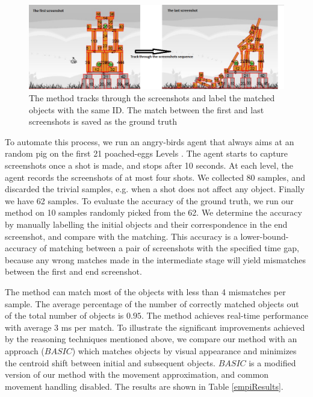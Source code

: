 \documentclass[letterpaper]{article}
\begin{document}
\begin{figure}[h!]
\centering\includegraphics[scale=0.32]{TrackingBackup.png}\caption{The method tracks through the screenshots and label the matched objects with the same ID. The match between the first and last screenshots is saved as the ground truth }
\label{Tracking}
\end{figure}

To automate this process, we run an angry-birds agent that always aims at an random pig on the first 21 poached-eggs Levels \cite{abGame}. The agent starts to capture screenshots once a shot is made, and stops after 10 seconds. At each level, the agent records the screenshots of at most four shots.
We collected 80 samples, and discarded the trivial samples, e.g. when a shot does not affect any object. Finally we have 62 samples. To evaluate the accuracy of the ground truth, we run our method on 10 samples randomly picked from the 62. We determine the accuracy by manually labelling the initial objects and their correspondence in the end screenshot, and compare with the matching. This accuracy is a lower-bound-accuracy of matching between a pair of screenshots with the specified time gap, because any wrong matches made in the intermediate stage will yield mismatches between the first and end screenshot.  

The method can match most of the objects with less than 4 mismatches per sample. The average percentage of the number of correctly matched objects out of the total number of objects is $0.95$. The method achieves real-time performance with average 3 ms per match. To illustrate the significant improvements achieved by the reasoning techniques mentioned above, we compare our method with an approach ($BASIC$) which matches objects by visual appearance and minimizes the centroid shift between initial and subsequent objects. $BASIC$ is a modified version of our method with the movement approximation, and common movement handling disabled. The results are shown in Table \ref{empiResults}.
\end{document}
